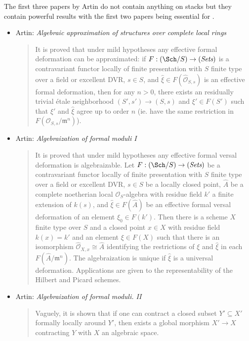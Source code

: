 \noindent
The first three papers by Artin do not contain anything on stacks but they
contain powerful results with the first two papers being essential for
\cite{ArtinVersal}.
\begin{itemize}
\item Artin: \emph{Algebraic approximation of structures over
complete local rings} \cite{Artin-Algebraic-Approximation}
\begin{quote}
It is proved that under mild hypotheses any effective formal deformation can be
approximated: if $F: (\Sch/S) \to (\textit{Sets})$
is a contravariant functor
locally of finite presentation with $S$ finite type over a field or excellent
DVR, $s \in S$, and $\hat{\xi} \in F(\hat{\mathcal{O}}_{S, s})$ is an effective
formal
deformation, then for any $n > 0$, there exists an residually trivial \'etale
neighborhood $(S', s') \to (S, s)$ and $\xi' \in F(S')$ such that $\xi'$ and
$\hat{\xi}$ agree up to order $n$ (ie. have the same restriction in
$F(\mathcal{O}_{S, s} / \mathfrak m^n)$).
\end{quote}
\item
Artin: \emph{Algebraization of formal moduli I} \cite{ArtinI}
\begin{quote}
It is proved that under mild hypotheses any effective formal versal deformation
is algebraizable. Let $F: (\Sch/S) \to (\textit{Sets})$ be a
contravariant functor
locally of finite presentation with $S$ finite type over a field or excellent
DVR, $s \in S$ be a locally closed point, $\hat A$ be a complete noetherian
local $\mathcal{O}_S$-algebra with residue field $k'$ a finite extension of
$k(s)$,
and $\hat{\xi} \in F(\hat A)$ be an effective formal versal deformation of an
element $\xi_0 \in F(k')$. Then there is a scheme $X$ finite type over $S$ and
a closed point $x \in X$ with residue field $k(x) = k'$ and an element $\xi \in
F(X)$ such that there is an isomorphism $\hat{\mathcal{O}}_{X, x} \cong \hat{A}$
identifying the restrictions of $\xi$ and $\hat{\xi}$ in each $F(\hat A /
\mathfrak m^n)$. The algebraization is unique if $\hat{\xi}$ is a universal
deformation. Applications are given to the representability of the Hilbert
and Picard schemes.
\end{quote}
\item Artin: \emph{Algebraization of formal moduli. II}
\cite{ArtinII}
\begin{quote}
Vaguely, it is shown that if one can contract a closed subset $Y' \subseteq X'$
formally locally around $Y'$, then exists a global morphism $X' \to X$
contracting $Y$ with $X$ an algebraic space.

\end{quote}
\end{itemize}
